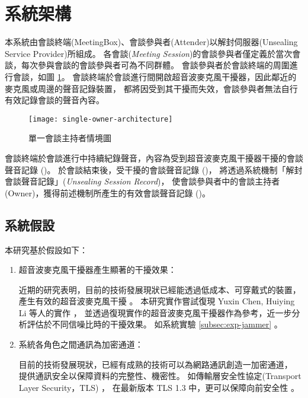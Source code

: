 \section{系統架構}\label{sec:arch}

    本系統由會談終端(MeetingBox)、會談參與者(Attender)以解封伺服器(Unsealing Service Provider)所組成。
各會談({\it Meeting Session})的會談參與者僅定義於當次會談，每次參與會談的會談參與者可為不同群體。
會談參與者於會談終端的周圍進行會談，如圖 \ref{fig:s-o-arch}。
會談終端於會談進行間開啟超音波麥克風干擾器，因此鄰近的麥克風或周邊的聲音記錄裝置，
都將因受到其干擾而失效，會談參與者無法自行有效記錄會談的聲音內容。

\begin{figure}[H]
    \centering
    \texttt{[image: single-owner-architecture]}
    \caption{單一會談主持者情境圖}\label{fig:s-o-arch}
\end{figure}

    會談終端於會談進行中持續紀錄聲音，內容為受到超音波麥克風干擾器干擾的會談聲音記錄 (\DEFrecJ)。
於會談結束後，受干擾的會談聲音記錄 (\DEFrecJ)，
將透過系統機制「解封會談聲音記錄」({\it Unsealing Session Record})，
使會談參與者中的會談主持者(Owner)，獲得前述機制所產生的有效會談聲音記錄 (\DEFrecREV)。


\subsection{系統假設}

    本研究基於假設如下：

\begin{enumerate}
    \item 超音波麥克風干擾器產生顯著的干擾效果：

        近期的研究表明，目前的技術發展現狀已經能透過低成本、可穿戴式的裝置，
    產生有效的超音波麥克風干擾 \cite{chen2020demonstrating}。
    本研究實作嘗試復現 Yuxin Chen, Huiying Li 等人的實作 \cite{chen2020wearable}，
    並透過復現實作的超音波麥克風干擾器作為參考，近一步分析評估於不同信噪比時的干擾效果。
    如系統實驗 \ref{subsec:exp-jammer} 。

    \item 系統各角色之間通訊為加密通道：

        目前的技術發展現狀，已經有成熟的技術可以為網路通訊創造一加密通道，
    提供通訊安全以保障資料的完整性、機密性。
    如傳輸層安全性協定(Transport Layer Security，TLS) \cite{rfc5246}，
    在最新版本 TLS 1.3 中，更可以保障向前安全性 \cite{rfc8446}。
\end{enumerate}


